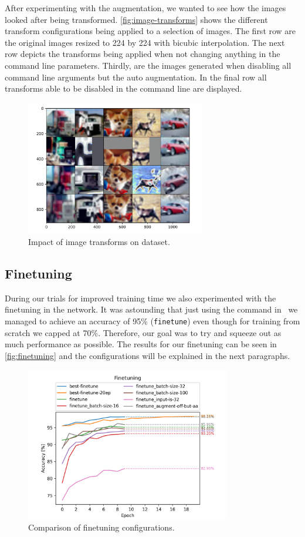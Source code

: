\documentclass{article}
\begin{document}
After experimenting with the augmentation, we wanted to see how the images looked after being transformed.
\autoref{fig:image-transforms} shows the different transform configurations being applied to a selection of images.
The first row are the original images resized to 224 by 224 with bicubic interpolation.
The next row depicts the transforms being applied when not changing anything in the command line parameters.
Thirdly, are the images generated when disabling all command line arguments but the auto augmentation.
In the final row all transforms able to be disabled in the command line are displayed.
\begin{figure}[h]
    \centering
    \includegraphics[width=0.7\textwidth]{images/image_transforms}
    \caption{Impact of image transforms on dataset.}
    \label{fig:image-transforms}
\end{figure}

\subsection{Finetuning}\label{subsec:finetuning}
During our trials for improved training time we also experimented with the finetuning in the network.
It was astounding that just using the command in~\cite{ayush0finetune} we managed to achieve an accuracy of 95\% (\texttt{finetune}) even though for training from scratch we capped at 70\%.
Therefore, our goal was to try and squeeze out as much performance as possible.
The results for our finetuning can be seen in \autoref{fig:finetuning} and the configurations will be explained in the next paragraphs.
\begin{figure}[h]
    \centering
    \includegraphics[width=0.8\textwidth]{images/finetuning}
    \caption{Comparison of finetuning configurations.}
    \label{fig:finetuning}
\end{figure}
\end{document}
